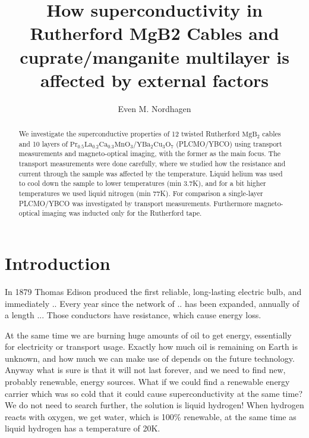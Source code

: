 \documentclass{comjnl}
\newcommand*\chem[1]{\ensuremath{\mathrm{#1}}}
\begin{document}
\title[Superconductivity in Rutherford MgB2 Cables and cuprate/manganite multilayer]{How superconductivity in Rutherford MgB2 Cables and cuprate/manganite multilayer is affected by external factors}
\author{Even M. Nordhagen}
 

 




\begin{abstract}
We investigate the superconductive properties of 12 twisted Rutherford \chem{MgB_2} cables and 10 layers of \chem{Pr_{0.5}La_{0.2}Ca_{0.3}MnO_3/YBa_2Cu_3O_7} (PLCMO/YBCO) using transport measurements and magneto-optical imaging, with the former as the main focus. The transport measurements were done carefully, where we studied how the resistance and current through the sample was affected by the temperature. Liquid helium was used to cool down the sample to lower temperatures (min 3.7K), and for a bit higher temperatures we used liquid nitrogen (min 77K). For comparison a single-layer PLCMO/YBCO was investigated by transport measurements. Furthermore magneto-optical imaging was inducted only for the Rutherford tape.
\end{abstract}

\maketitle


\section{Introduction}
In 1879 Thomas Edison produced the first reliable, long-lasting electric bulb, and immediately .. Every year since the network of .. has been expanded, annually of a length ... Those conductors have resistance, which cause energy loss. 

At the same time we are burning huge amounts of oil to get energy, essentially for electricity or transport usage. Exactly how much oil is remaining on Earth is unknown, and how much we can make use of depends on the future technology. Anyway what is sure is that it will not last forever, and we need to find new, probably renewable, energy sources. What if we could find a renewable energy carrier which was so cold that it could cause superconductivity at the same time? We do not need to search further, the solution is liquid hydrogen! When hydrogen reacts with oxygen, we get water, which is 100\% renewable, at the same time as liquid hydrogen has a temperature of 20K. 
\end{document}
